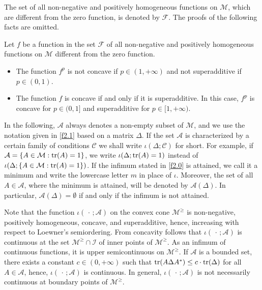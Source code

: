 \documentclass{amsart}
\begin{document}
The set of all non-negative and positively homogeneous functions on $\mathcal M$, which are different from the zero function, is denoted by $\mathcal F$. The proofs of the following facts are omitted.

\begin{lem} \label{l2.1}
    Let $f$ be a function in the set $\mathcal F$ of all non-negative and positively homogeneous functions on $\mathcal M$ different from the zero function.
\begin{itemize}
        \item[(i)]  The function $f^p$ is not concave if $p\in (1,+\infty)$ and not superadditive if $p\in (0,1)$.
        \item[(ii)]  The function $f$ is concave if and only if it is superadditive. In this case,  $f^p$ is concave
                                for $p\in (0,1]$ and superadditive for $p\in [1,+\infty)$.
\end{itemize}
\end{lem}

In the following, $\mathcal A$ always denotes a non-empty subset of $\mathcal M$, and we use the notation given in \eqref{f2.1} based on a matrix $\Delta$. If the set $\mathcal A$ is characterized by a certain family of conditions $\mathcal C$ we shall write $\iota(\Delta;{\mathcal C})$ for short. For example, if ${\mathcal A}=\{A\in {\mathcal M} : {\rm tr}(A) = 1\}$, we write $\iota(\Delta; {\rm tr}(A) = 1)$ instead of $\iota(\Delta;\{A\in {\mathcal M} : {\rm tr}(A) = 1\})$. If the infimum stated in \eqref{f2.0} is attained, we call it a minimum and write the lowercase letter $m$ in place of $\iota$. Moreover, the set of all $A\in {\mathcal A}$, where the minimum is attained, will be denoted by ${\mathcal A}(\Delta)$. In particular, ${\mathcal A}(\Delta)=\emptyset$ if and only if the infimum is not attained.

Note that the function $\iota(\,\cdot\,; {\mathcal A})$ on the convex cone  ${\mathcal M}^{\geq}$ is non-negative, positively homogeneous, concave, and superadditive, hence, increasing with respect to Loewner's semiordering.
From concavity follows that $\iota(\,\cdot\,; {\mathcal A})$ is continuous at the set ${\mathcal M}^{\geq} \cap {\mathcal I}$ of inner points of ${\mathcal M}^{\geq}$. As an infimum of continuous functions, it is upper semicontinuous on ${\mathcal M}^{\geq}$.
If ${\mathcal A}$ is a bounded set, there exists a constant $c\in(0,+\infty)$ such that ${\rm tr}( A \Delta A^*)\leq c \cdot {\rm tr}(\Delta)$ for all $A\in {\mathcal A}$, hence, $\iota(\,\cdot\,;{\mathcal A})$ is continuous.  In general, $\iota(\,\cdot\,;{\mathcal A})$ is not necessarily continuous at boundary points of ${\mathcal M}^{\geq}$.
\end{document}
